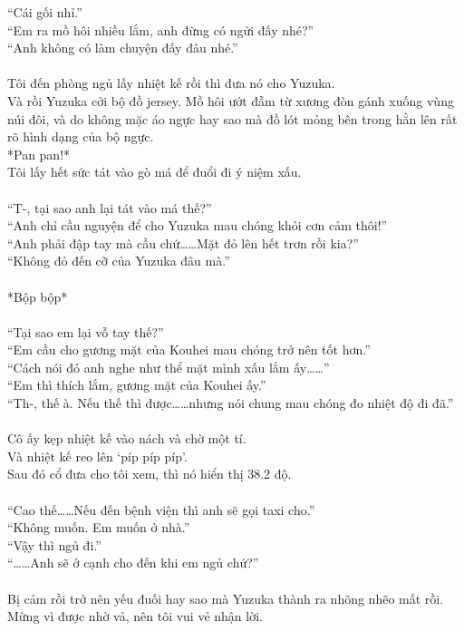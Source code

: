 \documentclass[12pt,a4paper, twosides]{book}
\begin{document}
“Cái gối nhỉ.”\\
“Em ra mồ hôi nhiều lắm, anh đừng có ngửi đấy nhé?”\\
“Anh không có làm chuyện đấy đâu nhé.”\\
\\
Tôi đến phòng ngủ lấy nhiệt kế rồi thì đưa nó cho Yuzuka.\\
Và rồi Yuzuka cởi bộ đồ jersey. Mồ hôi ướt đẫm từ xương đòn gánh xuống vùng núi đôi, và do không mặc áo ngực hay sao mà đồ lót mỏng bên trong hằn lên rất rõ hình dạng của bộ ngực.\\
*Pan pan!*\\
Tôi lấy hết sức tát vào gò má để đuổi đi ý niệm xấu.\\
\\
“T-, tại sao anh lại tát vào má thế?”\\
“Anh chỉ cầu nguyện để cho Yuzuka mau chóng khỏi cơn cảm thôi!”\\
“Anh phải đập tay mà cầu chứ……Mặt đỏ lên hết trơn rồi kia?”\\
“Không đỏ đến cỡ của Yuzuka đâu mà.”\\
\\
*Bộp bộp*\\
\\
“Tại sao em lại vỗ tay thế?”\\
“Em cầu cho gương mặt của Kouhei mau chóng trở nên tốt hơn.”\\
“Cách nói đó anh nghe như thể mặt mình xấu lắm ấy……”\\
“Em thì thích lắm, gương mặt của Kouhei ấy.”\\
“Th-, thế à. Nếu thế thì được……nhưng nói chung mau chóng đo nhiệt độ đi đã.”\\
\\
Cô ấy kẹp nhiệt kế vào nách và chờ một tí.\\
Và nhiệt kế reo lên ‘píp píp píp’.\\
Sau đó cổ đưa cho tôi xem, thì nó hiển thị 38.2 độ.\\
\\
“Cao thế……Nếu đến bệnh viện thì anh sẽ gọi taxi cho.”\\
“Không muốn. Em muốn ở nhà.”\\
“Vậy thì ngủ đi.”\\
“……Anh sẽ ở cạnh cho đến khi em ngủ chứ?”\\
\\
Bị cảm rồi trở nên yếu đuối hay sao mà Yuzuka thành ra nhõng nhẽo mất rồi.\\
Mừng vì được nhờ vả, nên tôi vui vẻ nhận lời.\\
\end{document}
